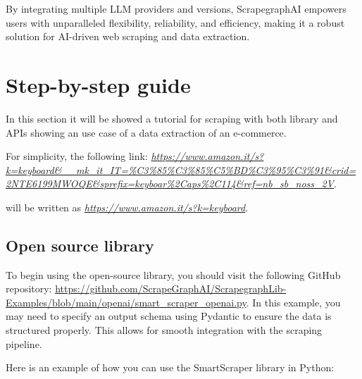 By integrating multiple LLM providers and versions, ScrapegraphAI empowers users with unparalleled flexibility, reliability, and efficiency, making it a robust solution for AI-driven web scraping and data extraction.
\section{Step-by-step guide}
In this section it will be showed a tutorial for scraping with both library and APIs showing an use case of a data extraction of an e-commerce.

For simplicity, the following link: \textit{\href{https://www.amazon.it/s?k=keyboard\&\_\_mk\_it\_IT=\%C3\%85\%C3\%85\%C5\%BD\%C3\%95\%C3\%91\&crid=2NTE6199MWOQE\&sprefix=keyboar\%2Caps\%2C114\&ref=nb_sb_noss_2V}{https://www.amazon.it/s?k=keyboard\&\_\_mk\_it\_IT=\%C3\%85\%C3\%85\%C5\%BD\%C3\%95\%C3\%91\&crid=2NTE6199MWOQE\&sprefix=keyboar\%2Caps\%2C114\&ref=nb_sb_noss_2V}}.

will be written as \textit{\url{https://www.amazon.it/s?k=keyboard}}.

\subsection{Open source library}

To begin using the open-source library, you should visit the following GitHub repository: \url{https://github.com/ScrapeGraphAI/ScrapegraphLib-Examples/blob/main/openai/smart_scraper_openai.py}. In this example, you may need to specify an output schema using Pydantic to ensure the data is structured properly. This allows for smooth integration with the scraping pipeline.

Here is an example of how you can use the SmartScraper library in Python:

